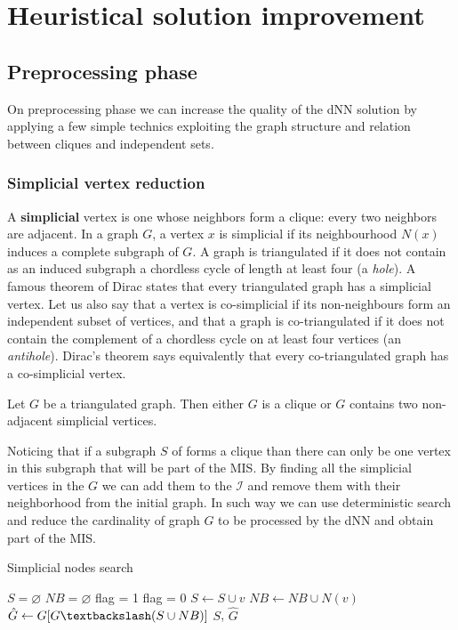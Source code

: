 \chapter{Heuristical solution improvement}
\section{Preprocessing phase}
On preprocessing phase we can increase the quality of the dNN solution by applying a few simple technics exploiting the graph structure and relation between cliques and independent sets.
\subsection{Simplicial vertex reduction}
A \textbf{simplicial} vertex is one whose neighbors form a clique: every two neighbors are adjacent.  
In a graph $G$, a vertex $x$ is simplicial if its neighbourhood $N(x)$ induces a complete
subgraph of $G$. A graph is triangulated if it does not contain as an induced subgraph
a chordless cycle of length at least four (a \textit{hole}). A famous theorem of Dirac \cite{HOANG2004117} states
that every triangulated graph has a simplicial vertex. Let us also say that a vertex is
co-simplicial if its non-neighbours form an independent subset of vertices, and that a
graph is co-triangulated if it does not contain the complement of a chordless cycle on at least four vertices (an \textit{antihole}). Dirac’s theorem says equivalently that every
co-triangulated graph has a co-simplicial vertex. 
\begin{theorem}[Dirac]
Let $G$ be a triangulated graph. Then either $G$ is a clique or
$G$ contains two non-adjacent simplicial vertices.
\end{theorem}

Noticing that if a subgraph $S$ of \graphG forms a clique than there can only be one vertex in this subgraph that will be part of the MIS. By finding all the simplicial vertices in the $G$ we can add them to the $\mathcal{I}$ and remove them with their neighborhood from the initial graph. In such way we can use deterministic search and  reduce the cardinality of graph $G$ to be processed by the dNN and obtain part of the MIS. 
\begin{algorithm}[H]
\caption{Simplicial nodes search}\label{alg:simplicial-nodes-search}
\begin{algorithmic}
    \State $S = \varnothing$
    \State $NB = \varnothing$
            \State flag = 1
                        \State flag = 0
                    \EndIf
                \EndFor
            \EndFor
                \State $S \leftarrow S \cup v$
                \State $NB \leftarrow NB \cup N(v)$
            \EndIf
        \EndIf
    \EndFor
    \State $\hat{G} \leftarrow G[G\textbackslash (S \cup NB)]$
    \State \Return $S$, $\hat{G}$
\EndFunction
\end{algorithmic}
\end{algorithm}

